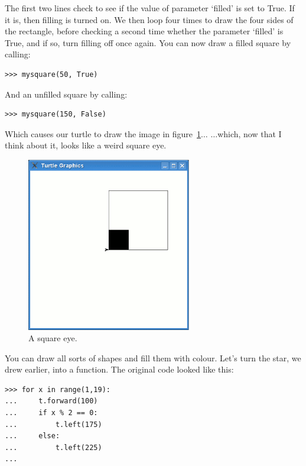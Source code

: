 The first two lines check to see if the value of parameter `filled' is set to True. If it is, then filling is turned on.  We then loop four times to draw the four sides of the rectangle, before checking a second time whether the parameter `filled' is True, and if so, turn filling off once again. You can now draw a filled square by calling:

\begin{listing}
\begin{verbatim}
>>> mysquare(50, True)
\end{verbatim}
\end{listing}

\noindent
And an unfilled square by calling:

\begin{listing}
\begin{verbatim}
>>> mysquare(150, False)
\end{verbatim}
\end{listing}

\noindent
Which causes our turtle to draw the image in figure~\ref{fig28}$\ldots$ $\ldots$which, now that I think about it, looks like a weird square eye.

\begin{figure}
\begin{center}
\includegraphics[width=72mm]{eps/figure28.eps}
\end{center}
\caption{A square eye.}\label{fig28}
\end{figure}

You can draw all sorts of shapes and fill them with colour. Let's turn the star, we drew earlier, into a function. The original code looked like this:

\begin{listing}
\begin{verbatim}
>>> for x in range(1,19):
...     t.forward(100)
...     if x % 2 == 0:
...         t.left(175)
...     else:
...         t.left(225)
...
\end{verbatim}
\end{listing}

